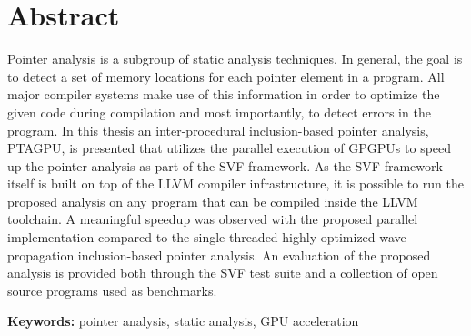\chapter*{Abstract}

Pointer analysis is a subgroup of static analysis techniques. 
In general, the goal is to detect a set of memory locations for each pointer element in a program. 
All major compiler systems make use of this information in order to optimize the given code during compilation
and most importantly, to detect errors in the program.
In this thesis an inter-procedural inclusion-based pointer analysis, PTAGPU, is presented that utilizes the parallel execution of GPGPUs to speed up the pointer analysis as part of the SVF framework. 
As the SVF framework itself is built on top of the LLVM compiler infrastructure, 
it is possible to run the proposed analysis on any program that can be compiled inside the LLVM toolchain.
A meaningful speedup was observed with the proposed parallel implementation compared to the single threaded highly optimized wave propagation inclusion-based pointer analysis.
An evaluation of the proposed analysis is provided both through the SVF test suite and a collection of open source programs used as benchmarks.

\textbf{Keywords:} pointer analysis, static analysis, GPU acceleration